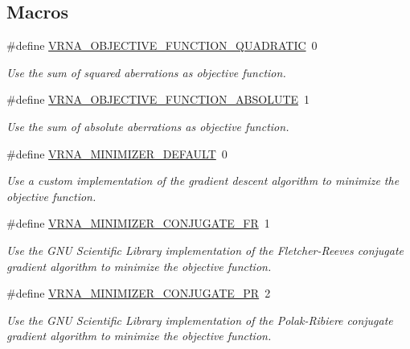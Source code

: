 \subsection*{Macros}
\begin{DoxyCompactItemize}
\item 
\#define \mbox{\hyperlink{group__perturbation_ga81e10993d1ae728e4e02022b33155a12}{V\+R\+N\+A\+\_\+\+O\+B\+J\+E\+C\+T\+I\+V\+E\+\_\+\+F\+U\+N\+C\+T\+I\+O\+N\+\_\+\+Q\+U\+A\+D\+R\+A\+T\+IC}}~0
\begin{DoxyCompactList}\small\item\em Use the sum of squared aberrations as objective function. \end{DoxyCompactList}\item 
\#define \mbox{\hyperlink{group__perturbation_gac070dfb9cafaeb14d5652bd9adf0f6b1}{V\+R\+N\+A\+\_\+\+O\+B\+J\+E\+C\+T\+I\+V\+E\+\_\+\+F\+U\+N\+C\+T\+I\+O\+N\+\_\+\+A\+B\+S\+O\+L\+U\+TE}}~1
\begin{DoxyCompactList}\small\item\em Use the sum of absolute aberrations as objective function. \end{DoxyCompactList}\item 
\#define \mbox{\hyperlink{group__perturbation_gae5126200d80dbb282f46083fffc606bf}{V\+R\+N\+A\+\_\+\+M\+I\+N\+I\+M\+I\+Z\+E\+R\+\_\+\+D\+E\+F\+A\+U\+LT}}~0
\begin{DoxyCompactList}\small\item\em Use a custom implementation of the gradient descent algorithm to minimize the objective function. \end{DoxyCompactList}\item 
\#define \mbox{\hyperlink{group__perturbation_gab1d89db58e8c497795a5005f5dbc8c4a}{V\+R\+N\+A\+\_\+\+M\+I\+N\+I\+M\+I\+Z\+E\+R\+\_\+\+C\+O\+N\+J\+U\+G\+A\+T\+E\+\_\+\+FR}}~1
\begin{DoxyCompactList}\small\item\em Use the G\+NU Scientific Library implementation of the Fletcher-\/\+Reeves conjugate gradient algorithm to minimize the objective function. \end{DoxyCompactList}\item 
\#define \mbox{\hyperlink{group__perturbation_ga5aaeafe1b0aa77a5cda18943ff94b02f}{V\+R\+N\+A\+\_\+\+M\+I\+N\+I\+M\+I\+Z\+E\+R\+\_\+\+C\+O\+N\+J\+U\+G\+A\+T\+E\+\_\+\+PR}}~2
\begin{DoxyCompactList}\small\item\em Use the G\+NU Scientific Library implementation of the Polak-\/\+Ribiere conjugate gradient algorithm to minimize the objective function. \end{DoxyCompactList}\item 

\end{DoxyCompactItemize}
